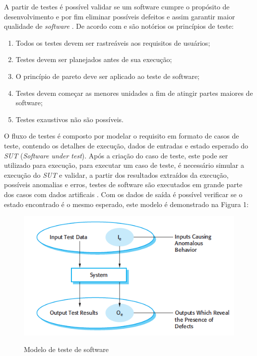 \documentclass[
	12pt,				%
	oneside,			%
	a4paper,			%
	english,			%
	brazil				%
	]{abntex2ppgsi}
\begin{document}
A partir de testes é possível validar se um software cumpre o propósito de desenvolvimento e por fim eliminar possíveis defeitos e assim garantir maior qualidade de \textit{software} \cite{Sommerville2010}. De acordo com \cite{pressman2009engenharia} e \cite{Davis1995} são notórios os princípios de teste: 

\begin{enumerate}
\item Todos os testes devem ser rastreáveis aos requisitos de usuários;
\item Testes devem ser planejados antes de sua execução;
\item O princípio de pareto deve ser aplicado ao teste de software;
\item Testes devem começar as menores unidades a fim de atingir partes maiores de software;
\item Testes exaustivos não são possíveis.
\end{enumerate}


O fluxo de testes  é composto por modelar o requisito em formato de casos de teste, contendo os detalhes de execução, dados de entradas e estado esperado do \textit{SUT} (\textit{Software under test}). Após a criação do caso de teste, este pode ser utilizado para execução, para executar um caso de teste,  é necessário simular a execução do \textit{SUT} e validar, a partir dos resultados extraídos da execução, possíveis anomalias e erros, testes de software são executados em grande parte dos casos com dados artificais \cite{Sommerville2010}. Com os dados de saída  é possível verificar se o estado encontrado é o mesmo esperado, este modelo é demonstrado na Figura 1:


\begin{figure}[H]%
	\centering
 	  \caption{Modelo de teste de software}
		\includegraphics{modelo-teste.png}
	\label{fig:tipos-custo-arvore}
\end{figure}
\end{document}
